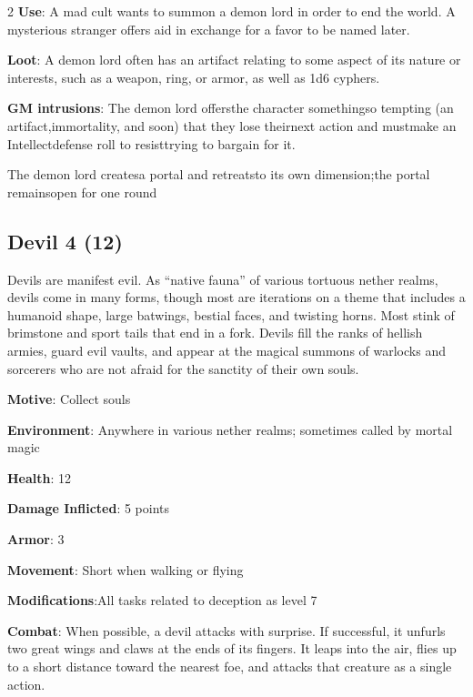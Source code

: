 \begin{multicols}{2}
\textbf{Use}: A mad cult wants to summon a demon lord in order to end the world. A mysterious stranger offers aid in exchange for a favor to be named later. 

\textbf{Loot}: A demon lord often has an artifact relating to some aspect of its nature or interests, such as a weapon, ring, or armor, as well as 1d6 cyphers.

\textbf{GM intrusions}:
The demon lord offersthe character somethingso tempting (an artifact,immortality, and soon) that they lose theirnext action and mustmake an Intellectdefense roll to resisttrying to bargain for it.

The demon lord createsa portal and retreatsto its own dimension;the portal remainsopen for one round

\subsection{Devil	4 (12)}

Devils are manifest evil. As “native fauna” of various tortuous nether realms, devils come in many forms, though most are iterations on a theme that includes a humanoid shape, large batwings, bestial faces, and twisting horns. Most stink of brimstone and sport tails that end in a fork. Devils fill the ranks of hellish armies, guard evil vaults, and appear at the magical summons of warlocks and sorcerers who are not afraid for the sanctity of their own souls.

\textbf{Motive}: Collect souls

\textbf{Environment}: Anywhere in various nether realms; sometimes called by mortal magic

\textbf{Health}: 12

\textbf{Damage Inflicted}: 5 points

\textbf{Armor}: 3

\textbf{Movement}: Short when walking or flying

\textbf{Modifications}:All tasks related to deception as level 7

\textbf{Combat}: When possible, a devil attacks with surprise. If successful, it unfurls two great wings and claws at the ends of its fingers. It leaps into the air, flies up to a short distance toward the nearest foe, and attacks that creature as a single action.


\end{multicols}
